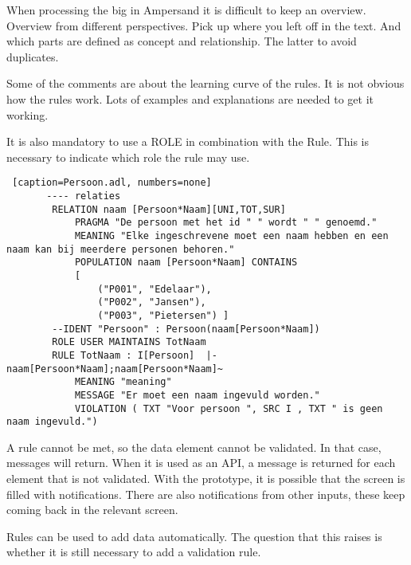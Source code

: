 When processing the \acrshort{big} in Ampersand it is difficult to keep an overview.
Overview from different perspectives.
Pick up where you left off in the text.
And which parts are defined as concept and relationship.
The latter to avoid duplicates.

Some of the comments are about the learning curve of the rules.
It is not obvious how the rules work.
Lots of examples and explanations are needed to get it working.

It is also mandatory to use a ROLE in combination with the Rule.
This is necessary to indicate which role the rule may use.
\begin{lstlisting} [caption=Persoon.adl, numbers=none]
       ---- relaties
        RELATION naam [Persoon*Naam][UNI,TOT,SUR]
            PRAGMA "De persoon met het id " " wordt " " genoemd."
            MEANING "Elke ingeschrevene moet een naam hebben en een naam kan bij meerdere personen behoren."
            POPULATION naam [Persoon*Naam] CONTAINS 
            [ 
                ("P001", "Edelaar"),
                ("P002", "Jansen"),
                ("P003", "Pietersen") ]
        --IDENT "Persoon" : Persoon(naam[Persoon*Naam])
        ROLE USER MAINTAINS TotNaam
        RULE TotNaam : I[Persoon]  |-  naam[Persoon*Naam];naam[Persoon*Naam]~
            MEANING "meaning"
            MESSAGE "Er moet een naam ingevuld worden."
            VIOLATION ( TXT "Voor persoon ", SRC I , TXT " is geen naam ingevuld.")
\end{lstlisting}

A rule cannot be met, so the data element cannot be validated.
In that case, messages will return.
When it is used as an API, a message is returned for each element that is not validated.
With the prototype, it is possible that the screen is filled with notifications.
There are also notifications from other inputs, these keep coming back in the relevant screen.

Rules can be used to add data automatically.
The question that this raises is whether it is still necessary to add a validation rule.

